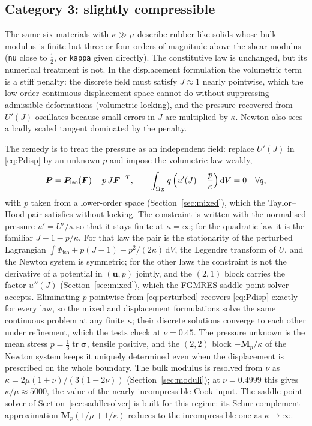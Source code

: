 \documentclass[11pt]{article}
\newcommand{\ud}{\,\mathrm{d}}
\newcommand{\tr}{\operatorname{tr}}
\newcommand{\bu}{\bm{u}}
\newcommand{\bsig}{\bm{\sigma}}
\newcommand{\bP}{\bm{P}}
\newcommand{\bF}{\bm{F}}
\newcommand{\bM}{\bm{M}}
\DeclareRobustCommand{\code}[1]{{\def\_{\textunderscore\allowbreak}\texttt{#1}}}
\begin{document}
\subsection{Category 3: slightly compressible}
\label{sec:nearly}

The same six materials with $\kappa \gg \mu$ describe rubber-like solids
whose bulk modulus is finite but three or four orders of magnitude above
the shear modulus (\code{nu} close to $\tfrac12$, or \code{kappa} given
directly).  The constitutive law is unchanged, but its numerical treatment
is not.  In the displacement formulation the volumetric term is a stiff
penalty: the discrete field must satisfy $J \approx 1$ nearly pointwise,
which the low-order continuous displacement space cannot do without
suppressing admissible deformations (volumetric locking), and the
pressure recovered from $U'(J)$ oscillates because small errors in
$J$ are multiplied by $\kappa$.  Newton also sees a badly scaled tangent
dominated by the penalty.

The remedy is to treat the pressure as an independent field: replace
$U'(J)$ in \eqref{eq:Pdisp} by an unknown $p$ and impose the volumetric law
weakly,
\begin{equation}
  \bP = \bP_{\mathrm{iso}}(\bF) + p\,J\bF^{-T},
  \qquad
  \int_{\Omega_R} q\,\Bigl(u'(J) - \frac{p}{\kappa}\Bigr)\ud V = 0 \quad \forall q,
  \label{eq:perturbed}
\end{equation}
with $p$ taken from a lower-order space (Section~\ref{sec:mixed}), which the
Taylor--Hood pair satisfies without locking.  The constraint is written
with the normalised pressure $u' = U'/\kappa$ so that it stays finite at
$\kappa = \infty$; for the quadratic law it is the familiar
$J - 1 - p/\kappa$.  For that law the pair is the stationarity of the
perturbed Lagrangian
$\int\Psi_{\mathrm{iso}} + p(J-1) - p^2/(2\kappa)\ud V$, the Legendre
transform of $U$, and the Newton system is symmetric; for the other laws
the constraint is not the derivative of a potential in $(\bu, p)$ jointly,
and the $(2,1)$ block carries the factor $u''(J)$ (Section~\ref{sec:mixed}),
which the FGMRES saddle-point solver accepts.  Eliminating $p$ pointwise
from \eqref{eq:perturbed} recovers \eqref{eq:Pdisp} exactly for every law,
so the mixed and displacement formulations solve the same continuous
problem at any finite $\kappa$; their discrete solutions converge to each
other under refinement, which the tests check at $\nu = 0.45$.  The
pressure unknown is the mean stress $p = \tfrac13\tr\bsig$, tensile
positive, and the $(2,2)$ block $-\bM_p/\kappa$ of the Newton system keeps
it uniquely determined even when the displacement is prescribed on the
whole boundary.  The bulk modulus is resolved from $\nu$ as
$\kappa = 2\mu(1+\nu)/(3(1-2\nu))$ (Section~\ref{sec:moduli}); at
$\nu = 0.4999$ this gives $\kappa/\mu \approx 5000$, the value of the
nearly incompressible Cook input.  The saddle-point solver of
Section~\ref{sec:saddlesolver} is built for this regime: its Schur
complement approximation $\bM_p(1/\mu + 1/\kappa)$ reduces to the
incompressible one as $\kappa \to \infty$.
\end{document}
